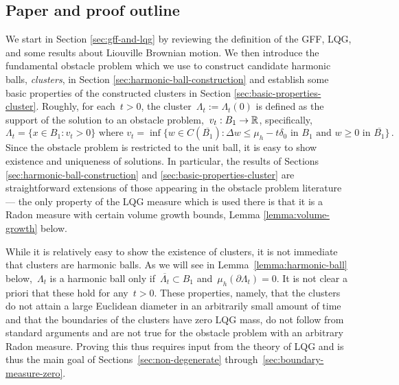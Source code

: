 \documentclass[12pt]{amsart}
\numberwithin{equation}{section}
\begin{document}
	
	
	\subsection{Paper and proof outline}
	
	
	We start in Section \ref{sec:gff-and-lqg} by reviewing the definition of the GFF, LQG, and some results about Liouville Brownian motion.  We then introduce the fundamental obstacle problem  which we use to construct candidate harmonic balls,  {\it clusters}, in Section \ref{sec:harmonic-ball-construction}
	and establish some basic properties of the constructed clusters in Section \ref{sec:basic-properties-cluster}.	Roughly, for each~$t > 0$, the cluster~$\Lambda_t := \Lambda_t(0)$ is defined as the support of the solution to an obstacle problem,~$v_t : B_1 \to \mathbb{R}$, specifically, 
	\[
	\Lambda_t = \{x \in B_1 : v_t > 0 \} \, \, \mbox{where} \, \,  v_t = \inf\{ w \in C(\overline{B_1}) :  \Delta w \leq \mu_h - t \delta_0 \mbox{ in $B_1$}  \mbox{ and }  w \geq  0 \mbox{ in $\overline{B_1}$}\} \, . 
	\]
	Since the obstacle problem is restricted to the unit ball, it is easy to show existence and uniqueness of solutions. In particular, 
	the results of Sections \ref{sec:harmonic-ball-construction} and \ref{sec:basic-properties-cluster} are straightforward extensions of those appearing in the obstacle problem literature --- the only property of the LQG measure which is used there is that it is a Radon measure with certain volume growth bounds, Lemma \ref{lemma:volume-growth} below. 
	
	While it is relatively easy to show the existence of clusters, it is not immediate that clusters are harmonic balls. As we will see in Lemma~\ref{lemma:harmonic-ball}
	below,~$\Lambda_t$ is a harmonic ball only if~$\overline{\Lambda_t} \subset B_1$ and~$\mu_h(\partial \Lambda_t) = 0$. It is not clear a priori that these hold for any~$t > 0$. These properties, namely, that the clusters do not attain a large Euclidean diameter in an arbitrarily small amount of time and that the boundaries of the clusters have zero LQG mass, do not follow from standard arguments and are not true for the obstacle problem with an arbitrary Radon measure.
	Proving this thus requires input from the theory of LQG and is thus the main goal of Sections~\ref{sec:non-degenerate} through~\ref{sec:boundary-measure-zero}.
	
\end{document}
